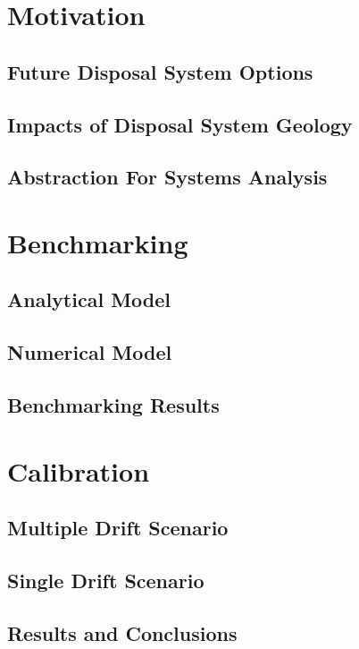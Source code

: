 

\section{Motivation}
\subsection{Future Disposal System Options}

\subsection{Impacts of Disposal System Geology}

\subsection{Abstraction For Systems Analysis}


\section{Benchmarking}
\subsection{Analytical Model}

\subsection{Numerical Model}

\subsection{Benchmarking Results}


\section{Calibration}
\subsection{Multiple Drift Scenario}

\subsection{Single Drift Scenario}

\subsection{Results and Conclusions}


